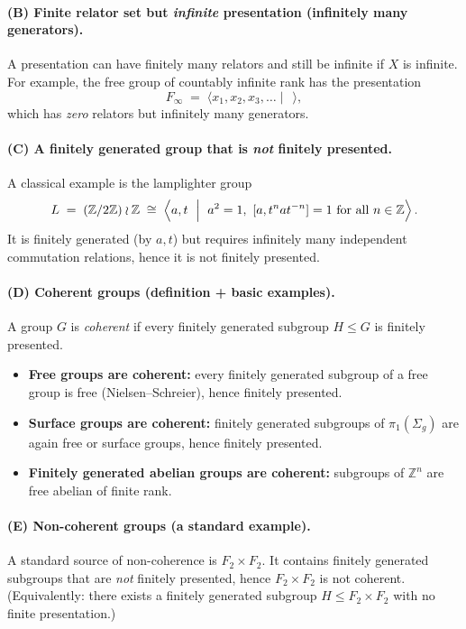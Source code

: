 \documentclass[11pt]{article}
\theoremstyle{definition}
\theoremstyle{plain}
\theoremstyle{remark}
\begin{document}
\paragraph{(B) Finite relator set but \emph{infinite} presentation (infinitely many generators).}
A presentation can have finitely many relators and still be infinite if $X$ is infinite.
For example, the free group of countably infinite rank has the presentation
\[
F_\infty \;=\; \langle x_1,x_2,x_3,\dots \mid \ \ \rangle,
\]
which has \emph{zero} relators but infinitely many generators.

\paragraph{(C) A finitely generated group that is \emph{not} finitely presented.}
A classical example is the lamplighter group
\[
L \;=\; (\mathbb Z/2\mathbb Z)\wr \mathbb Z
\;\cong\;
\left\langle a,t \ \Bigm|\ a^2=1,\ [a,t^n a t^{-n}]=1\ \text{for all }n\in\mathbb Z \right\rangle.
\]
It is finitely generated (by $a,t$) but requires infinitely many independent commutation relations, hence it is not finitely presented.

\paragraph{(D) Coherent groups (definition + basic examples).}
A group $G$ is \emph{coherent} if every finitely generated subgroup $H\le G$ is finitely presented.
\begin{itemize}[leftmargin=2em]
\item \textbf{Free groups are coherent:} every finitely generated subgroup of a free group is free (Nielsen--Schreier),
hence finitely presented.
\item \textbf{Surface groups are coherent:} finitely generated subgroups of $\pi_1(\Sigma_g)$ are again free or surface groups,
hence finitely presented.
\item \textbf{Finitely generated abelian groups are coherent:} subgroups of $\mathbb Z^n$ are free abelian of finite rank.
\end{itemize}

\paragraph{(E) Non-coherent groups (a standard example).}
A standard source of non-coherence is $F_2\times F_2$.
It contains finitely generated subgroups that are \emph{not} finitely presented, hence $F_2\times F_2$ is not coherent.
(Equivalently: there exists a finitely generated subgroup $H\le F_2\times F_2$ with no finite presentation.)
\end{document}
